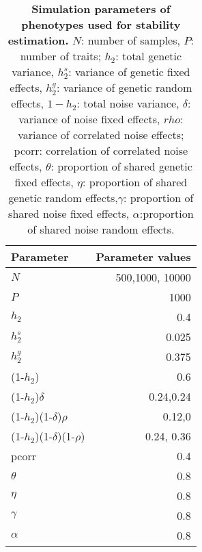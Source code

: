 \begin{table}[h]
  \centering
  \caption[\textbf{Simulation parameters of phenotypes used for stability estimation. }]{\textbf{Simulation parameters of phenotypes used for stability estimation. }\(N\): number of samples, \(P\): number of traits; \(h_2\): total genetic variance, \(h_2^s\): variance of genetic  fixed effects, \(h_2^g\): variance of genetic random effects, \(1 - h_2\): total noise variance, \(\delta\): variance of noise fixed effects, \(rho\): variance of correlated noise effects; pcorr: correlation of correlated noise effects, \(\theta\): proportion of shared genetic fixed effects, \(\eta\):  proportion of shared genetic random effects,\(\gamma\): proportion of shared noise fixed effects, \(\alpha\):proportion of shared noise random effects.}
    \begin{tabular}{lr}
    \toprule
    Parameter & Parameter values \\
    \midrule
    \(N\) & \num{500},\num{1000}, \num{10000} \\
    \(P\) & \num{1000} \\
    \addlinespace[1.5ex]
    \(h_2\) & 0.4 \\
    \(h_2^s\) & 0.025 \\
    \(h_2^g\) & 0.375 \\
   \addlinespace[1.5ex]
    (1-\(h_2\)) & 0.6 \\
    (1-\(h_2\))\(\delta\) & 0.24,0.24 \\
    (1-\(h_2\))(1-\(\delta\))\(\rho\) & 0.12,0 \\
    (1-\(h_2\))(1-\(\delta\))(1-\(\rho\)) & 0.24, 0.36 \\
   \addlinespace[1.5ex]
    pcorr & 0.4 \\
    \(\theta\) & 0.8 \\
    \(\eta\) & 0.8 \\
    \(\gamma\) & 0.8 \\
    \(\alpha\) & 0.8 \\
    \bottomrule
    \end{tabular}%
  \label{tab:parametersSimulationDimRed}%
\end{table}%


